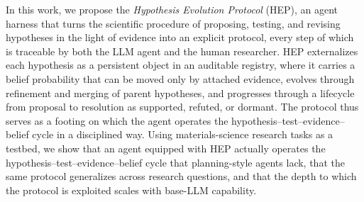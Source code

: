 In this work, we propose the \emph{Hypothesis Evolution Protocol} (HEP),
an agent harness that turns the scientific procedure of proposing,
testing, and revising hypotheses in the light of evidence into an
explicit protocol, every step of which is traceable by both the LLM
agent and the human researcher.
HEP externalizes each hypothesis as a persistent object in an auditable
registry, where it carries a belief probability that can be moved
only by attached evidence, evolves through refinement and merging of parent
hypotheses, and progresses through a lifecycle from proposal to
resolution as supported, refuted, or dormant.
The protocol thus serves as a footing on which the agent operates the
hypothesis--test--evidence--belief cycle in a disciplined way.
Using materials-science research tasks as a testbed, we show that an agent
equipped with HEP actually operates the hypothesis--test--evidence--belief
cycle that planning-style agents lack, that the same protocol generalizes
across research questions, and that the depth
to which the protocol is exploited scales with base-LLM capability.
